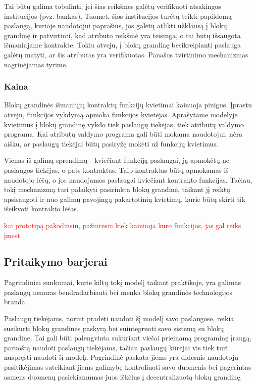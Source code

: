 Tai būtų galima tobulinti, jei šias reikšmes galėtų verifikuoti
atsakingos institucijos (pvz. bankas). Tuomet, šios institucijos turėtų teikti papildomą paslaugą, kurioje naudotojui
paprašius, jos galėtų atlikti užklausą į blokų grandinę ir patvirtinti, kad atributo reikšmė yra teisinga, o tai būtų
išsaugota išmaniajame kontrakte. Tokiu atveju,
į blokų grandinę besikreipianti paslauga galėtų matyti, ar šis atributas yra verifikuotas. Panašus tvirtinimo mechanizmas
nagrinėjamas \cite{Baars2016} tyrime.

\tocless\subsubsection{Kaina}

Blokų grandinės išmaniųjų kontraktų funkcijų kvietimai kainuoja pinigus. Įprastu atveju, funkcijos vykdymą apmoka
funkcijos kvietėjas.
Aprašytame modelyje kvietimus į blokų grandinę vykdo tiek paslaugų tiekėjas, tiek atributų valdymo programa. Kai atributų valdymo
programa gali būti mokama naudotojui, nėra aišku, ar paslaugų tiekėjai būtų pasiryžę mokėti už funkcijų kvietimus.

Vienas iš galimų sprendimų - kviečiant funkciją paslaugai, ją apmokėtų ne paslaugos tiekėjas, o pats kontraktas. Taip
kontraktas būtų apmokamas iš naudotojo lėšų, o jos naudojamos paslaugai kviečiant kontrakto funkcijas.
Tačiau, tokį mechanizmą turi palaikyti pasirinkta blokų grandinė, taikant jį reiktų apsisaugoti ir nuo
galimų pavojingų pakartotinių kvietimų, kurie būtų skirti tik išeikvoti kontrakto lėšas.

\textcolor{red}{kai prototipą pakodinsiu, pažiūrėsiu kiek kainuoja kuro funkcijos, jas gal reiks įmest}

\subsection{Pritaikymo barjerai}

Pagrindiniai sunkumai, kurie kiltų tokį modelį taikant praktikoje, yra galimas paslaugų nenoras bendradarbiauti bei menka blokų grandinės
technologijos branda.

Paslaugų tiekėjams, norint pradėti naudoti šį modelį savo paslaugose, reikia susikurti blokų grandinės paskyrą bei suintegruoti
savo sistemą su blokų grandine. Tai gali būti palengvinta sukuriant viešai prieinamą programinę įrangą, paruoštą naudoti paslaugų
tiekėjams, tačiau paslaugų kūrėjai vis tiek turi nuspręsti naudoti šį modelį. Pagrindinė paskata jiems yra didesnis naudotojų pasitikėjimas
suteikiant jiems galimybę kontroliuoti savo duomenis bei pagerintas asmens duomenų pasiekiamumas juos iškėlus į decentralizuotą blokų grandinę.


